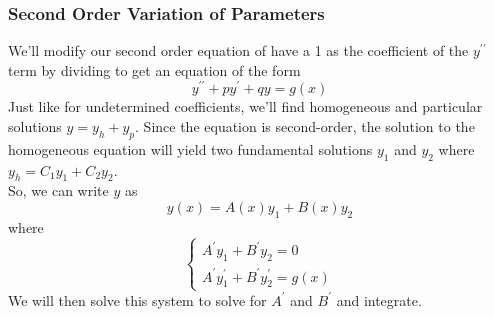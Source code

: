 \subsubsection{Second Order Variation of Parameters}
\noindent
We'll modify our second order equation of have a 1 as the coefficient of the $y^{\prime\prime}$ term by dividing to get an equation of the form
\begin{equation*}
	y^{\prime\prime} + py^\prime + qy = g(x)
\end{equation*}
Just like for undetermined coefficients, we'll find homogeneous and particular solutions $y = y_h + y_p$. Since the equation is second-order, the solution to the homogeneous equation will yield two fundamental solutions $y_1$ and $y_2$ where $y_h = C_1y_1 + C_2y_2$.\\

\noindent
So, we can write $y$ as
\begin{equation*}
	y(x) = A(x)y_1 + B(x)y_2
\end{equation*}
where
\begin{equation*}
	\begin{cases}
		A^\prime y_1 + B^\prime y_2 = 0 \\
		A^\prime y_1^\prime + B^\prime y_2^\prime = g(x)
	\end{cases}
\end{equation*}
We will then solve this system to solve for $A^\prime$ and $B^\prime$ and integrate.

\ifodd{}\fi